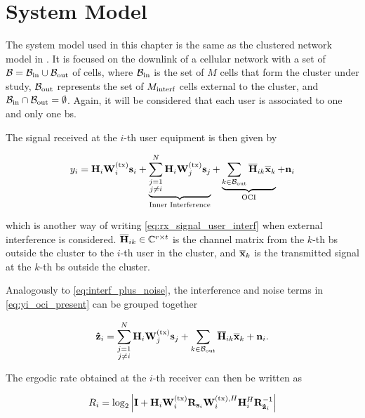 \section{System Model}\label{sec:sched_system_model}

The system model used in this chapter is the same as the clustered network model
in . It is focused on the downlink of a cellular network
with a set of $\mathcal{B} = \mathcal{B}_{\text{in}} \cup \mathcal{B}_{\text{out}}$ of cells, where $\mathcal{B}_{\text{in}}$ is the set of $M$
cells that form the cluster under study, $\mathcal{B}_{\text{out}}$ represents the set of
$M_{\text{interf}}$ cells external to the cluster, and $\mathcal{B}_{\text{in}} \cap \mathcal{B}_{\text{out}} = \emptyset$.
Again, it will be considered that each user is associated to one and only one
\gls{bs}.

The signal received at the $i$-th user equipment is then given by

\begin{equation} \label{eq:yi_oci_present}
    y_i = \mathbf{H}_i \mathbf{W}^{(\text{tx})}_i \mathbf{s}_i + \underbrace{\sum\limits_{\substack{j=1\\j\neq i}}
    ^{N} \mathbf{H}_i \mathbf{W}^{(\text{tx})}_j \mathbf{s}_j}_{\text{Inner Interference}} +
    \underbrace{\sum\limits_{k \in \mathcal{B}_{\text{out}}} \mathbf{\overline{H}}_{ik} \mathbf{\overline{x}}_k}_{\text{OCI}}
    + \mathbf{n}_i
\end{equation}

\noindent
which is another way of writing \eqref{eq:rx_signal_user_interf} when external
interference is considered. $\mathbf{\overline{H}}_{ik} \in \mathbb{C}^{r \times t}$ is the channel
matrix from the $k$-th \gls{bs} outside the cluster to the $i$-th user in the
cluster, and $\mathbf{\overline{x}}_k$ is the transmitted signal at the $k$-th \gls{bs} outside
the cluster.

Analogously to \eqref{eq:interf_plus_noise}, the interference and noise terms in
\eqref{eq:yi_oci_present} can be grouped together

\begin{equation} \label{eq:zi_hat}
    \mathbf{\hat{z}}_i = \sum\limits_{\substack{j=1\\j\neq i}}^{N} \mathbf{H}_i \mathbf{W}^{(\text{tx})}_j \mathbf{s}_j +
    \sum\limits_{k \in \mathcal{B}_{\text{out}}} \mathbf{\overline{H}}_{ik} \mathbf{\overline{x}}_k + \mathbf{n}_i.
\end{equation}

The ergodic rate obtained at the $i$-th receiver can then be written as

\begin{equation} \label{eq:rate_yi_oci}
    R_i = \log_2\left|\mathbf{I} + \mathbf{H}_i\mathbf{W}^{(\text{tx})}_i\mathbf{R}_{\mathbf{s}_i}\mathbf{W}^{(\text{tx}),H}_i\mathbf{H}_i^H
    \mathbf{R}_{\mathbf{\hat{z}}_i}^{-1}\right|
\end{equation}

